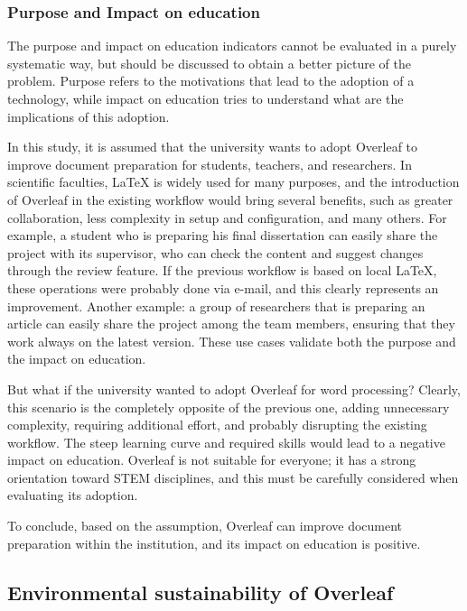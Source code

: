 \subsubsection{Purpose and Impact on education}
The purpose and impact on education indicators cannot be evaluated in a purely systematic way, but should be discussed to obtain a better picture of the problem. Purpose refers to the motivations that lead to the adoption of a technology, while impact on education tries to understand what are the implications of this adoption.

In this study, it is assumed that the university wants to adopt Overleaf to improve document preparation for students, teachers, and researchers. In scientific faculties, LaTeX is widely used for many purposes, and the introduction of Overleaf in the existing workflow would bring several benefits, such as greater collaboration, less complexity in setup and configuration, and many others. For example, a student who is preparing his final dissertation can easily share the project with its supervisor, who can check the content and suggest changes through the review feature. If the previous workflow is based on local LaTeX, these operations were probably done via e-mail, and this clearly represents an improvement. Another example: a group of researchers that is preparing an article can easily share the project among the team members, ensuring that they work always on the latest version. These use cases validate both the purpose and the impact on education.

But what if the university wanted to adopt Overleaf for word processing? Clearly, this scenario is the completely opposite of the previous one, adding unnecessary complexity, requiring additional effort, and probably disrupting the existing workflow. The steep learning curve and required skills would lead to a negative impact on education. Overleaf is not suitable for everyone; it has a strong orientation toward STEM disciplines, and this must be carefully considered when evaluating its adoption.

To conclude, based on the assumption, Overleaf can improve document preparation within the institution, and its impact on education is positive.

\bigskip

\subsection{Environmental sustainability of Overleaf}
\label{subsec:overleaf-environmental}
\medskip

